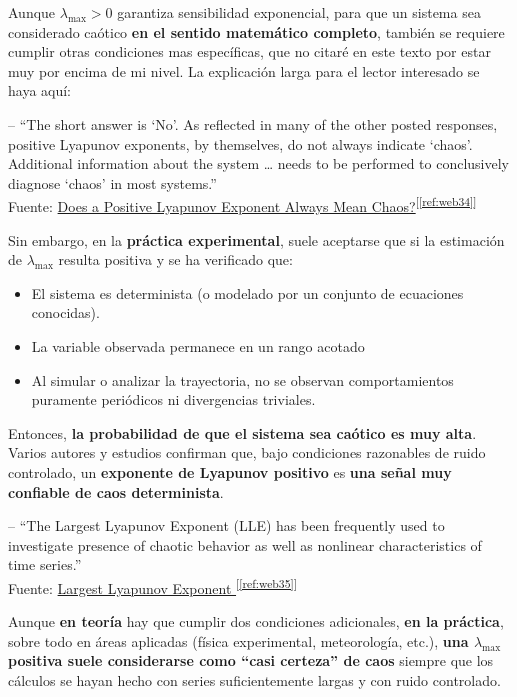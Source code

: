 \documentclass[
  10pt,
  a4paper,
  DIV=11,
  numbers=noendperiod,
  open=any]{scrreprt}
\providecommand{\tightlist}{%
  \setlength{\itemsep}{0pt}\setlength{\parskip}{0pt}}
\numberwithin{equation}{chapter}
\numberwithin{equation}{section}
\renewcommand{\[}{\begin{equation}}
\renewcommand{\]}{\end{equation}}
\newcommand{\refweb}[3]{%
  \href{#1}{#2}\textsuperscript{[\ref{ref:#3}]}%
}
\begin{document}
Aunque \(\lambda_{\max} > 0\) garantiza sensibilidad exponencial, para
que un sistema sea considerado caótico \textbf{en el sentido matemático
completo}, también se requiere cumplir otras condiciones mas específicas,
que no citaré en este texto por estar muy por encima de mi nivel. La
explicación larga para el lector interesado se haya aquí:

-- ``The short answer is `No'. As reflected in many of the other posted
responses, positive Lyapunov exponents, by themselves, do not always
indicate `chaos'. Additional information about the system \ldots{} needs
to be performed to conclusively diagnose `chaos' in most systems.''\\
Fuente: \refweb{https://www.researchgate.net/post/Does-positive-Lyapunov-exponent-always-mean-chaos}{Does a Positive Lyapunov Exponent Always Mean Chaos?}{web34}

Sin embargo, en la \textbf{práctica experimental}, suele aceptarse que si la estimación de \(\lambda_{\max}\)
resulta positiva y se ha verificado que:

\begin{itemize}
\tightlist
\item
  El sistema es determinista (o modelado por un conjunto de ecuaciones
  conocidas).\\
\item
  La variable observada permanece en un rango acotado
\item
  Al simular o analizar la trayectoria, no se observan comportamientos
  puramente periódicos ni divergencias triviales.
\end{itemize}

Entonces, \textbf{la probabilidad de que el sistema sea caótico es muy
alta}. Varios autores y estudios confirman que, bajo condiciones
razonables de ruido controlado, un \textbf{exponente de Lyapunov
positivo} es \textbf{una señal muy confiable de caos determinista}.

-- ``The Largest Lyapunov Exponent (LLE) has been frequently used to
investigate presence of chaotic behavior as well as nonlinear
characteristics of time series.''\\
Fuente: \refweb{https://www.sciencedirect.com/topics/engineering/largest-lyapunov-exponent}{Largest Lyapunov Exponent }{web35}

Aunque \textbf{en teoría} hay que cumplir dos condiciones adicionales,
\textbf{en la práctica}, sobre todo en áreas aplicadas (física
experimental, meteorología, etc.), \textbf{una \(\lambda_{\max}\)
positiva suele considerarse como ``casi certeza'' de caos} siempre que
los cálculos se hayan hecho con series suficientemente largas y con
ruido controlado.
\end{document}
